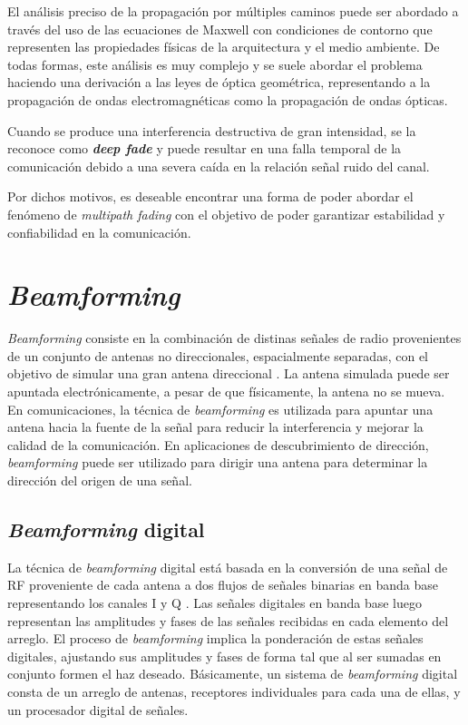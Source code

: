 El análisis preciso de la propagación por múltiples caminos puede ser abordado a través del uso de las ecuaciones de Maxwell con condiciones de contorno que representen las propiedades físicas de la arquitectura y el medio ambiente. De todas formas, este análisis es muy complejo y se suele abordar el problema haciendo una derivación a las leyes de óptica geométrica, representando a la propagación de ondas electromagnéticas como la propagación de ondas ópticas.

Cuando se produce una interferencia destructiva de gran intensidad, se la reconoce como \textbf{\textit{deep fade}} y puede resultar en una falla temporal de la comunicación debido a una severa caída en la relación señal ruido del canal.

Por dichos motivos, es deseable encontrar una forma de poder abordar el fenómeno de \textit{multipath fading} con el objetivo de poder garantizar estabilidad y confiabilidad en la comunicación.

\section{\textit{Beamforming}}

\textit{Beamforming} consiste en la combinación de distinas señales de radio provenientes de un conjunto de antenas no direccionales, espacialmente separadas, con el objetivo de simular una gran antena direccional \cite{Haynes}. La antena simulada puede ser apuntada electrónicamente, a pesar de que físicamente, la antena no se mueva. En comunicaciones, la técnica de \textit{beamforming} es utilizada para apuntar una antena hacia la fuente de la señal para reducir la interferencia y mejorar la calidad de la comunicación. En aplicaciones de descubrimiento de dirección, \textit{beamforming} puede ser utilizado para dirigir una antena para determinar la dirección del origen de una señal.

\subsection{\textit{Beamforming} digital}

La técnica de \textit{beamforming} digital está basada en la conversión de una señal de RF proveniente de cada antena a dos flujos de señales binarias en banda base representando los canales I y Q \cite{Litva}. Las señales digitales en banda base luego representan las amplitudes y fases de las señales recibidas en cada elemento del arreglo. El proceso de \textit{beamforming} implica la ponderación de estas señales digitales, ajustando sus amplitudes y fases de forma tal que al ser sumadas en conjunto formen el haz deseado. Básicamente, un sistema de \textit{beamforming} digital consta de un arreglo de antenas, receptores individuales para cada una de ellas, y un procesador digital de señales.

